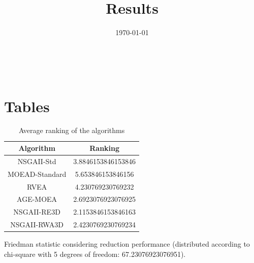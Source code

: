 \documentclass{article}
\title{Results}
\author{}
\date{\today}
\begin{document}
\oddsidemargin 0in \topmargin 0in\maketitle
\
\section{Tables}
\begin{table}[!htp]
\centering
\caption{Average ranking of the algorithms}
\begin{tabular}{c|c}
Algorithm&Ranking\\
\hline
NSGAII-Std&3.8846153846153846\\
MOEAD-Standard&5.653846153846156\\
RVEA&4.230769230769232\\
AGE-MOEA&2.6923076923076925\\
NSGAII-RE3D&2.1153846153846163\\
NSGAII-RWA3D&2.4230769230769234\\
\end{tabular}
\end{table}


Friedman statistic considering reduction performance (distributed according to chi-square with 5 degrees of freedom: 67.23076923076951).
\end{document}
